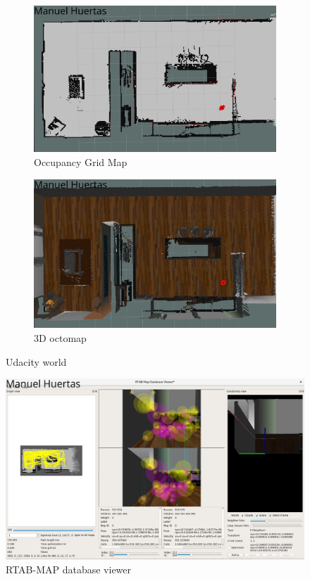 \documentclass[10pt,journal,compsoc]{IEEEtran}
\begin{document}
\begin{figure}[h]
\centering
\begin{subfigure}[b]{0.24\textwidth}
\includegraphics[scale=0.12]{udacity-occupancy-grid}
\caption{Occupancy Grid Map}
\end{subfigure}
\begin{subfigure}[b]{0.24\textwidth}
\includegraphics[scale=0.12]{udacity-3d-map}
\caption{3D octomap}
\end{subfigure}
\caption{Udacity world}
\end{figure}

\begin{figure}[h]
\centering
\includegraphics[scale=0.15]{RTAB-Map-Udacity}
\caption{RTAB-MAP database viewer}
\label{fig:world}
\end{figure}
\end{document}

